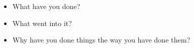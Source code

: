 \begin{itemize}
    \item What have you done?
    \item What went into it?
    \item Why have you done things the way you have done them?
\end{itemize}
